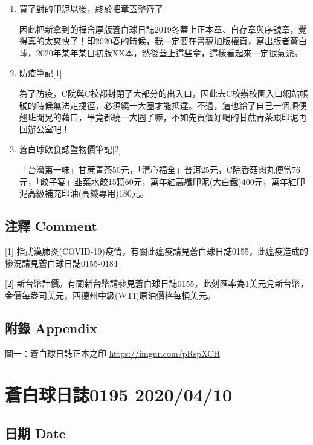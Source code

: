 \documentclass[a5paper, 11pt
]{book}
\begin{document}
\begin{enumerate}
\def\labelenumi{\arabic{enumi}.}
\item
  買了對的印泥以後，終於把章蓋整齊了

  因此把新拿到的樺舍厚版蒼白球日誌2019冬蓋上正本章、自存章與序號章，覺得真的太爽快了！印2020春的時候，我一定要在書稿加版權頁，寫出版者蒼白球，2020年某年某日初版XX本，然後蓋上這些章，這樣看起來一定很氣派。
\item
  防疫筆記{[}1{]}

  為了防疫，C院與C校都封閉了大部分的出入口，因此去C校辦校園入口網站帳號的時候無法走捷徑，必須繞一大圈才能抵達。不過，這也給了自己一個順便翹班閒晃的藉口，畢竟都繞一大圈了嘛，不如先買個好喝的甘蔗青茶跟印泥再回辦公室吧！
\item
  蒼白球飲食誌暨物價筆記{[}2{]}

  「台灣第一味」甘蔗青茶50元，「清心福全」普洱25元，C院香菇肉丸便當76元，「餃子宴」韭菜水餃15顆60元，萬年紅高纖印泥(大白鐵)400元，萬年紅印泥高級補充印油(高纖專用)180元。
\end{enumerate}

\hypertarget{ux6ce8ux91cb-comment-39}{%
\subsection{注釋 Comment}\label{ux6ce8ux91cb-comment-39}}

{[}1{]}
指武漢肺炎(COVID-19)疫情，有關此瘟疫請見蒼白球日誌0155，此瘟疫造成的慘況請見蒼白球日誌0155-0184

{[}2{]}
新台幣計價。有關新台幣請參見蒼白球日誌0155。此刻匯率為1美元兌新台幣，金價每盎司美元，西德州中級(WTI)原油價格每桶美元。

\hypertarget{ux9644ux9304-appendix-39}{%
\subsection{附錄 Appendix}\label{ux9644ux9304-appendix-39}}

圖一：蒼白球日誌正本之印 \url{https://imgur.com/pRspXCH}

\hypertarget{ux84bcux767dux7403ux65e5ux8a8c0195-20200410}{%
\section{蒼白球日誌0195
2020/04/10}\label{ux84bcux767dux7403ux65e5ux8a8c0195-20200410}}

\hypertarget{ux65e5ux671f-date-40}{%
\subsection{日期 Date}\label{ux65e5ux671f-date-40}}
\end{document}
